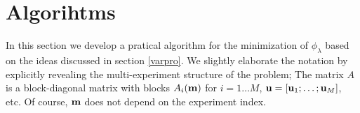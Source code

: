 \documentclass{iopart}
\begin{document}

\section{Algorihtms}
\label{algorithm}
In this section we develop a pratical algorithm for the minimization of $\phi_{\lambda}$ based 
on the ideas discussed in section \ref{varpro}. We slightly elaborate the notation by explicitly revealing the multi-experiment structure of the problem;
The matrix $A$ is a block-diagonal matrix with blocks $A_i(\mathbf{m})$ for $i=1\ldots M$, $\mathbf{u} = [\mathbf{u}_1; \ldots; \mathbf{u}_{M}]$, etc.
Of course, $\mathbf{m}$ does not depend on the experiment index.
\end{document}

